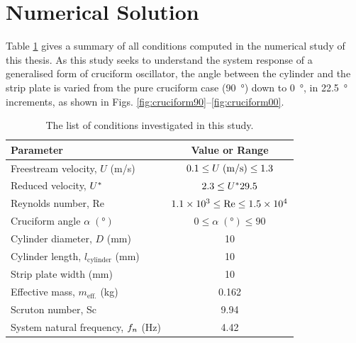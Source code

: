 \documentclass[oneside]{utmthesis}
\begin{document}
\section{Numerical Solution} \label{sec:numericalSolution}

\vspace{\baselineskip}

Table \ref{tab:researchMatrix} gives a summary of all conditions computed in the numerical study of this thesis. As this study seeks to understand the system response of a generalised form of cruciform oscillator, the angle between the cylinder and the strip plate is varied from the pure cruciform case (\SI{90}{\degree}) down to \SI{0}{\degree}, in \SI{22.5}{\degree} increments, as shown in Figs. \ref{fig:cruciform90}--\ref{fig:cruciform00}.

\begin{table}[!ht]
\centering
\caption{The list of conditions investigated in this study.} \label{tab:researchMatrix}
\vspace{\baselineskip}
\setlength{\tabcolsep}{10pt}      %
\renewcommand{\arraystretch}{1.5} %
\begin{tabular}{l c}
  \hline
  \hline
  Parameter                                  & Value or Range                                                     \\
  \hline
  Freestream velocity, $U$ (m/s)             & $0.1 \leq U \; (\si[per-mode=symbol]{\metre\per\second}) \leq 1.3$ \\
  Reduced velocity, $U^{*}$                  & $2.3 \leq U^{*} 29.5$                                              \\
  Reynolds number, Re                        & $1.1 \times 10^{3} \leq \text{Re} \leq 1.5 \times 10^{4}$                \\
  Cruciform angle $\alpha \; (\si{\degree})$ & $0 \leq \alpha \; (\si{\degree}) \leq 90$                          \\
  Cylinder diameter, $D$ (mm)                 & 10                                                                 \\
  Cylinder length, $l_{\text{cylinder}}$ (mm) & 10                                                                 \\
  Strip plate width (mm)                     & 10                                                                 \\
  Effective mass, $m_{\text{eff.}}$ (kg)     & 0.162                                                              \\
  Scruton number, Sc                         & 9.94                                                               \\
  System natural frequency, $f_{n}$ (Hz)       & 4.42                                                               \\
  \hline
  \hline
\end{tabular}
\end{table}
\end{document}

